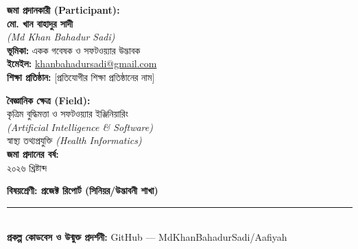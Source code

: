 \documentclass[12pt,a4paper,oneside]{report}
\begin{document}
\begin{titlepage}
\begin{tcolorbox}
    \vspace{1.2cm}
    \begin{minipage}[t]{0.48\textwidth}
        \flushleft
        \textbf{\large জমা প্রদানকারী (Participant):}\\[0.2cm]
        \textbf{\Large মো. খান বাহাদুর সাদী}\\[0.1cm]
        \textit{(Md Khan Bahadur Sadi)}\\[0.2cm]
        \textbf{ভূমিকা:} একক গবেষক ও সফটওয়্যার উদ্ভাবক\\[0.1cm]
        \textbf{ইমেইল:} \href{mailto:khanbahadursadi@gmail.com}{khanbahadursadi@gmail.com}\\[0.1cm]
        \textbf{শিক্ষা প্রতিষ্ঠান:} [প্রতিযোগীর শিক্ষা প্রতিষ্ঠানের নাম]
    \end{minipage}
    \hfill
    \begin{minipage}[t]{0.48\textwidth}
        \flushright
        \textbf{\large বৈজ্ঞানিক ক্ষেত্র (Field):}\\[0.2cm]
        কৃত্রিম বুদ্ধিমত্তা ও সফটওয়্যার ইঞ্জিনিয়ারিং\\
        \textit{(Artificial Intelligence \& Software)}\\[0.2cm]
        স্বাস্থ্য তথ্যপ্রযুক্তি \textit{(Health Informatics)}\\[0.5cm]
        \textbf{জমা প্রদানের বর্ষ:}\\
        ২০২৬ খ্রিষ্টাব্দ
    \end{minipage}

    \vfill
    {\large\textbf{বিষয়শ্রেণী: প্রজেক্ট রিপোর্ট (সিনিয়র/উদ্ভাবনী শাখা)}\par}
    \vspace{0.3cm}
    \textcolor{deepEmerald}{\rule{8cm}{0.8pt}}\\[0.2cm]
    {\small\textbf{প্রকল্প কোডবেস ও উন্মুক্ত প্রদর্শনী:} GitHub — MdKhanBahadurSadi/Aafiyah}
    \end{tcolorbox}
\end{titlepage}

\tableofcontents
\newpage
\listoffigures
\newpage
\listoftables
\newpage

\setcounter{page}{1}

\end{document}
